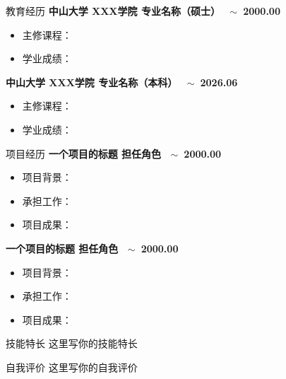 \documentclass[a4paper, utf8]{ctexart}
\begin{document}
    \begin{unit}{教育经历 \vspace{.5em}}{}
        {\bfseries \large 中山大学 \qquad XXX学院 \qquad 专业名称（硕士） \ $\sim$\ 2000.00}
        \begin{itemize}[itemsep=0pt, topsep=2pt, parsep=2pt]
            \item 主修课程：
            \item 学业成绩：
        \end{itemize}

        \vspace{.25em}

        {\bfseries \large 中山大学 \qquad XXX学院 \qquad 专业名称（本科） \ $\sim$\ 2026.06}
        \begin{itemize}[itemsep=0pt, topsep=2pt, parsep=2pt]
            \item 主修课程：
            \item 学业成绩：
        \end{itemize}
    \end{unit}

    \begin{unit}{项目经历 \vspace{.5em}}{}
        {\bfseries \large 一个项目的标题 \qquad 担任角色 \ $\sim$\ 2000.00}
        \begin{itemize}[itemsep=0pt, topsep=2pt, parsep=2pt]
            \item 项目背景：
            \item 承担工作：
            \item 项目成果：
        \end{itemize}

        \vspace{.25em}
        
        {\bfseries \large 一个项目的标题 \qquad 担任角色 \ $\sim$\ 2000.00}
        \begin{itemize}[itemsep=0pt, topsep=2pt, parsep=2pt]
            \item 项目背景：
            \item 承担工作：
            \item 项目成果：
        \end{itemize}
    \end{unit}

    \begin{unit}{技能特长 \vspace{.5em}}{}
        \vspace{.25em}
        这里写你的技能特长
    \end{unit}

    \begin{unit}{自我评价 \vspace{.5em}}{}
        \vspace{.25em}
        这里写你的自我评价
    \end{unit}
\end{document}
